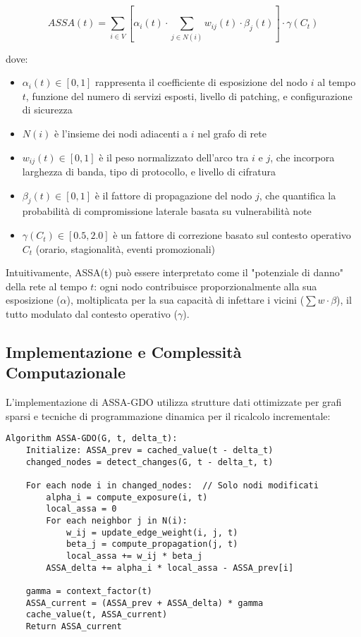 \begin{equation}
ASSA(t) = \sum_{i \in V} \left[ \alpha_i(t) \cdot \sum_{j \in N(i)} w_{ij}(t) \cdot \beta_j(t) \right] \cdot \gamma(C_t)
\label{eq:assa_formula}
\end{equation}

dove:
\begin{itemize}
\item $\alpha_i(t) \in [0,1]$ rappresenta il coefficiente di esposizione del nodo $i$ al tempo $t$, funzione del numero di servizi esposti, livello di patching, e configurazione di sicurezza
\item $N(i)$ è l'insieme dei nodi adiacenti a $i$ nel grafo di rete
\item $w_{ij}(t) \in [0,1]$ è il peso normalizzato dell'arco tra $i$ e $j$, che incorpora larghezza di banda, tipo di protocollo, e livello di cifratura
\item $\beta_j(t) \in [0,1]$ è il fattore di propagazione del nodo $j$, che quantifica la probabilità di compromissione laterale basata su vulnerabilità note
\item $\gamma(C_t) \in [0.5, 2.0]$ è un fattore di correzione basato sul contesto operativo $C_t$ (orario, stagionalità, eventi promozionali)
\end{itemize}

Intuitivamente, ASSA(t) può essere interpretato come il "potenziale di danno" della rete al tempo $t$: ogni nodo contribuisce proporzionalmente alla sua esposizione ($\alpha$), moltiplicata per la sua capacità di infettare i vicini ($\sum w \cdot \beta$), il tutto modulato dal contesto operativo ($\gamma$).

\subsection{\texorpdfstring{Implementazione e Complessità Computazionale}{2.4.3 - Implementazione e Complessità Computazionale}}

L'implementazione di ASSA-GDO utilizza strutture dati ottimizzate per grafi sparsi e tecniche di programmazione dinamica per il ricalcolo incrementale:

\begin{verbatim}
Algorithm ASSA-GDO(G, t, delta_t):
    Initialize: ASSA_prev = cached_value(t - delta_t)
    changed_nodes = detect_changes(G, t - delta_t, t)
    
    For each node i in changed_nodes:  // Solo nodi modificati
        alpha_i = compute_exposure(i, t)
        local_assa = 0
        For each neighbor j in N(i):
            w_ij = update_edge_weight(i, j, t)
            beta_j = compute_propagation(j, t)
            local_assa += w_ij * beta_j
        ASSA_delta += alpha_i * local_assa - ASSA_prev[i]
    
    gamma = context_factor(t)
    ASSA_current = (ASSA_prev + ASSA_delta) * gamma
    cache_value(t, ASSA_current)
    Return ASSA_current
\end{verbatim}

